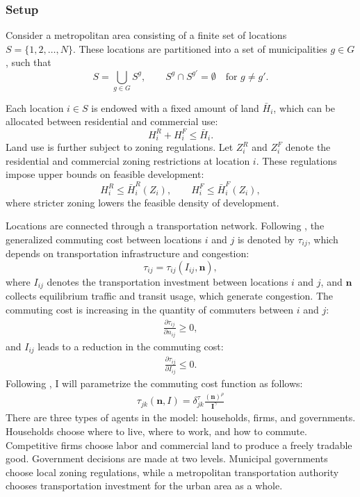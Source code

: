 \documentclass[12pt, a4paper]{article}
\begin{document}
\subsubsection{Setup}
Consider a metropolitan area consisting of a finite set of locations \(S=\{1,2,\dots,N\}\). These locations are partitioned into a set of municipalities \(g\in G\), such that
\[
S=\bigcup_{g\in G} S^g, \qquad S^g \cap S^{g'}=\emptyset \quad \text{for } g\neq g'.
\]

Each location \(i\in S\) is endowed with a fixed amount of land \(\bar H_{i}\), which can be allocated between residential and commercial use:
\[
H_i^R + H_i^F \leq \bar H_{i}.
\]
Land use is further subject to zoning regulations. Let \(Z_i^R\) and \(Z_i^F\) denote the residential and commercial zoning restrictions at location \(i\). These regulations impose upper bounds on feasible development:
\[
H_i^R \leq \bar H_i^R(Z_i), \qquad H_i^F \leq \bar H_i^F(Z_i),
\]
where stricter zoning lowers the feasible density of development.

Locations are connected through a transportation network. Following \cite{Fajgelbaum2020-yv}, the generalized commuting cost between locations \(i\) and \(j\) is denoted by \(\tau_{ij}\), which depends on transportation infrastructure and congestion:
\[
\tau_{ij} = \tau_{ij}(I_{ij}, \mathbf n),
\]
where \(I_{ij}\) denotes the transportation investment between locations \(i\) and \(j\), and \(\mathbf n\) collects equilibrium traffic and transit usage, which generate congestion. The commuting cost is increasing in the quantity of commuters between \(i\) and \(j\):
\begin{align}
\frac{\partial \tau_{ij}}{\partial n_{ij}} \geq 0,
\end{align}
and $I_{ij}$ leads to a reduction in the commuting cost:
\begin{align}
\frac{\partial \tau_{ij}}{\partial I_{ij}} \leq 0.
\end{align}
Following \cite{Fajgelbaum2020-yv}, I will parametrize the commuting cost function as follows:
\begin{align}
    \tau_{jk}(\mathbf n,I)=\delta^{\tau}_{jk}\frac{(\mathbf{n})^{\rho}}{\mathbf{I}^{\gamma}}
\end{align}
There are three types of agents in the model: households, firms, and governments. Households choose where to live, where to work, and how to commute. Competitive firms choose labor and commercial land to produce a freely tradable good. Government decisions are made at two levels. Municipal governments choose local zoning regulations, while a metropolitan transportation authority chooses transportation investment for the urban area as a whole.
\end{document}
